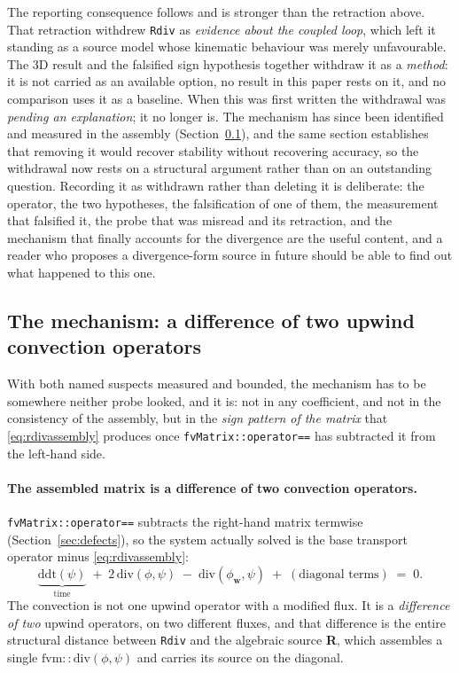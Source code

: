 \documentclass[preprint,3p,11pt]{elsarticle}
\newcommand{\psilev}{\psi}
\begin{document}
The reporting consequence follows and is stronger than the retraction above. That
retraction withdrew \texttt{Rdiv} as \emph{evidence about the coupled loop}, which
left it standing as a source model whose kinematic behaviour was merely
unfavourable. The 3D result and the falsified sign hypothesis together withdraw it
as a \emph{method}: it is not carried as an available option, no result in this
paper rests on it, and no comparison uses it as a baseline. When this was first
written the withdrawal was \emph{pending an explanation}; it no longer is. The
mechanism has since been identified and measured in the assembly
(Section~\ref{sec:rdiv-mechanism}), and the same section establishes that removing
it would recover stability without recovering accuracy, so the withdrawal now rests
on a structural argument rather than on an outstanding question. Recording it as
withdrawn rather than deleting it is deliberate: the operator, the two hypotheses,
the falsification of one of them, the measurement that falsified it, the probe that
was misread and its retraction, and the mechanism that finally accounts for the
divergence are the useful content, and a reader who proposes a divergence-form
source in future should be able to find out what happened to this one.

\subsection{The mechanism: a difference of two upwind convection operators}
\label{sec:rdiv-mechanism}

With both named suspects measured and bounded, the mechanism has to be somewhere
neither probe looked, and it is: not in any coefficient, and not in the
consistency of the assembly, but in the \emph{sign pattern of the matrix} that
\eqref{eq:rdivassembly} produces once \texttt{fvMatrix::operator==} has subtracted
it from the left-hand side.

\paragraph{The assembled matrix is a difference of two convection operators.}
\texttt{fvMatrix::operator==} subtracts the right-hand matrix termwise
(Section~\ref{sec:defects}), so the system actually solved is the base transport
operator minus \eqref{eq:rdivassembly}:
\begin{equation}
  \underbrace{\mathrm{ddt}(\psilev)}_{\text{time}}
  \;+\; 2\,\mathrm{div}(\phi,\psilev)
  \;-\; \mathrm{div}(\phi_{\mathbf{w}},\psilev)
  \;+\; (\text{diagonal terms}) \;=\; 0 .
  \label{eq:rdivmatrix}
\end{equation}
The convection is not one upwind operator with a modified flux. It is a
\emph{difference of two} upwind operators, on two different fluxes, and that
difference is the entire structural distance between \texttt{Rdiv} and the
algebraic source \textbf{R}, which assembles a single $\mathrm{fvm::div}(\phi,
\psilev)$ and carries its source on the diagonal.
\end{document}
